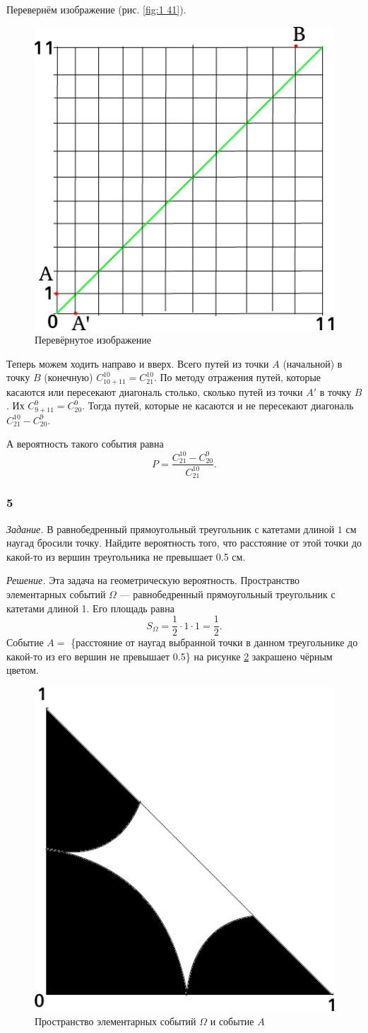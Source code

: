 Перевернём изображение (рис. \ref{fig:1	41}).

\begin{figure}[h!]
  \centering
  \includegraphics[width=.4\textwidth]{./pictures/t1v1_41.png}
  \caption{Перевёрнутое изображение}
  \label{fig:141}
\end{figure}

Теперь можем ходить направо и вверх.
Всего путей из точки $A$ (начальной) в точку $B$ (конечную) $C_{10+11}^{10} = C_{21}^{10}$.
По методу отражения путей, которые касаются или пересекают диагональ столько, сколько путей из точки $A'$ в точку $B$.
Их $C_{9+11}^9 = C_{20}^9$.
Тогда путей, которые не касаются и не пересекают диагональ $C_{21}^{10} - C_{20}^9$.

А вероятность такого события равна
$$P =
\frac{C_{21}^{10} - C_{20}^9}{C_{21}^{10}}.$$

\subsubsection*{5}

\textit{Задание.} В равнобедренный прямоугольный треугольник с катетами длиной $1$ см наугад бросили точку.
Найдите вероятность того, что расстояние от этой точки до какой-то из вершин треугольника не превышает 0.5 см.

\textit{Решение.} Эта задача на геометрическую вероятность.
Пространство элементарных событий $ \Omega $ --- равнобедренный прямоугольный треугольник с катетами длиной 1.
Его площадь равна
$$S_{ \Omega } =
\frac{1}{2} \cdot 1 \cdot 1 =
\frac{1}{2}.$$
Событие $A =$ \{расстояние от наугад выбранной точки в данном треугольнике до какой-то из его вершин не превышает 0.5\} на рисунке \ref{fig:5} закрашено чёрным цветом.

\begin{figure}[h!]
  \centering
  \includegraphics[width=.4\textwidth]{./pictures/t1v1_5.png}
  \caption{Пространство элементарных событий $ \Omega $ и событие $A$}
  \label{fig:5}
\end{figure}

